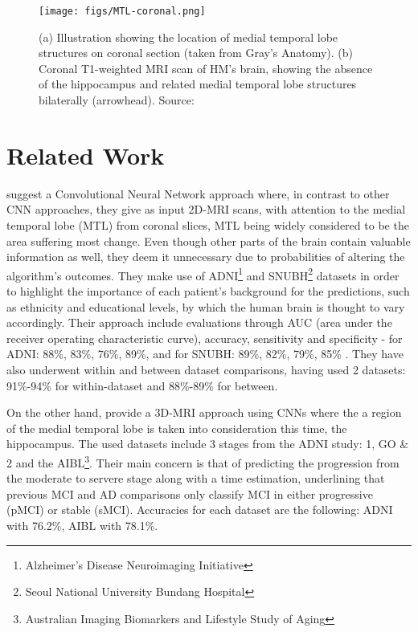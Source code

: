 \documentclass[a4paper, 12pt]{article}
\begin{document}
\begin{figure}[htbp]
    \centering
    \texttt{[image: figs/MTL-coronal.png]}
    \caption{(a) Illustration showing the location of medial temporal lobe structures on coronal section
     (taken from Gray's Anatomy). (b) Coronal T1-weighted MRI scan of HM's brain, showing the absence of the 
     hippocampus and related medial temporal lobe structures bilaterally (arrowhead). Source: \cite{MTL-image}}
    \label{fig:MTL}
\end{figure}

\newpage


\section{Related Work} %
\cite{bae2020} suggest a Convolutional Neural Network approach where, in contrast to other CNN approaches, they give as input
2D-MRI scans, with attention to the medial temporal lobe (MTL) from coronal slices, MTL being widely considered to be the
area suffering most change. Even though other parts of the brain contain valuable information as well, they deem it
unnecessary due to probabilities of altering the algorithm's outcomes. They make use of ADNI\footnote{Alzheimer's Disease Neuroimaging Initiative}
and SNUBH\footnote{Seoul National University Bundang Hospital} datasets in order to highlight the importance of each patient's background for
the predictions, such as ethnicity and educational levels, by which the human brain is thought to vary accordingly.
Their approach include evaluations through AUC (area under the receiver operating characteristic curve), accuracy, sensitivity and specificity
- for ADNI: 88\%, 83\%, 76\%, 89\%, and for SNUBH: 89\%, 82\%, 79\%, 85\% . They have also underwent within and between dataset comparisons,
having used 2 datasets: 91\%-94\% for within-dataset and 88\%-89\% for between.

On the other hand, \cite{PMID-31201098} provide a 3D-MRI approach using CNNs where the a region of the medial temporal lobe
is taken into consideration this time, the hippocampus. The used datasets include 3 stages from the ADNI study: 1, GO \& 2 and
the AIBL\footnote{Australian Imaging Biomarkers and Lifestyle Study of Aging}. Their main concern is that of predicting the
progression from the moderate to servere stage along with a time estimation, underlining that previous MCI and AD comparisons
only classify MCI in either progressive (pMCI) or stable (sMCI). Accuracies for each dataset are the following: ADNI with
76.2\%, AIBL with 78.1\%.
\end{document}
